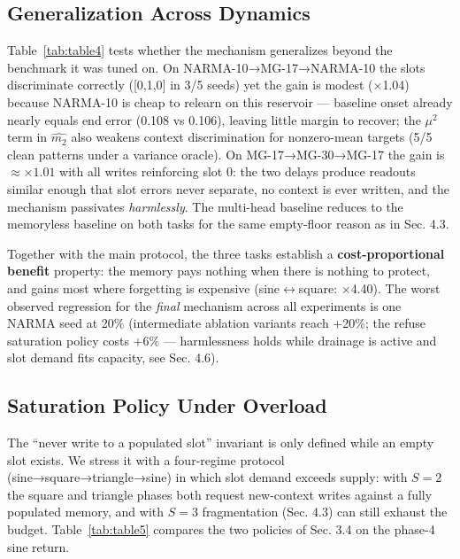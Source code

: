 \documentclass[11pt]{article}
\begin{document}
\subsection{Generalization Across Dynamics}\label{generalization-across-dynamics}

\begin{table}[t]
\centering\small
\caption{F3-onset NMSE on cross-family dynamics; MultiHead equals the
baseline to printed precision.}
\label{tab:table4}

\end{table}

Table~\ref{tab:table4} tests whether the mechanism generalizes beyond the benchmark it
was tuned on. On NARMA-10→MG-17→NARMA-10 the slots discriminate
correctly ({[}0,1,0{]} in 3/5 seeds) yet the gain is modest (×1.04) because
NARMA-10 is cheap to relearn on this reservoir --- baseline onset already
nearly equals end error (0.108 vs 0.106), leaving little margin to
recover; the \(\mu^2\) term in \(\widehat{m_2}\) also weakens context
discrimination for nonzero-mean targets (5/5 clean patterns under a
variance oracle). On MG-17→MG-30→MG-17 the gain is \(\approx\times 1.01\) with all
writes reinforcing slot 0: the two delays produce readouts similar
enough that slot errors never separate, no context is ever written, and
the mechanism passivates \emph{harmlessly}. The multi-head baseline reduces
to the memoryless baseline on both tasks for the same empty-floor
reason as in Sec. 4.3.

Together with the main protocol, the three tasks establish a
\textbf{cost-proportional benefit} property: the memory pays nothing when
there is nothing to protect, and gains most where forgetting is
expensive (sine\(\leftrightarrow\)square: ×4.40). The worst observed regression for
the \emph{final} mechanism across all experiments is one NARMA seed at 20\%
(intermediate ablation variants reach +20\%; the refuse saturation
policy costs +6\% --- harmlessness holds while drainage is active and
slot demand fits capacity, see Sec. 4.6).

\subsection{Saturation Policy Under Overload}\label{saturation-policy-under-overload}

The ``never write to a populated slot'' invariant is only defined while
an empty slot exists. We stress it with a four-regime protocol
(sine→square→triangle→sine) in which slot demand exceeds supply: with
\(S{=}2\) the square and triangle phases both request new-context
writes against a fully populated memory, and with \(S{=}3\)
fragmentation (Sec. 4.3) can still exhaust the budget. Table~\ref{tab:table5}
compares the two policies of Sec. 3.4 on the phase-4 sine return.
\end{document}
